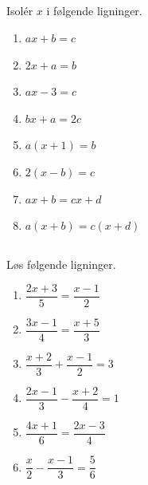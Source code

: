 \documentclass[10pt,a4paper,table]{article}
\begin{document}
\subsection{}
Isolér $x$ i følgende ligninger.
\begin{enumerate}[label=\arabic*)]
  \item $ax + b = c$
  \item $2x + a = b$
  \item $ax - 3 = c$
  \item $bx + a = 2c$
  \item $a(x + 1) = b$
  \item $2(x - b) = c$
  \item $ax + b = cx + d$
  \item $a(x + b) = c(x + d)$
\end{enumerate}

\subsection{}
Løs følgende ligninger.
\begin{enumerate}[label=\arabic*)]
  \item $\dfrac{2x+3}{5} = \dfrac{x-1}{2}$
  \item $\dfrac{3x-1}{4} = \dfrac{x+5}{3}$
  \item $\dfrac{x+2}{3} + \dfrac{x-1}{2} = 3$
  \item $\dfrac{2x-1}{3} - \dfrac{x+2}{4} = 1$
  \item $\dfrac{4x+1}{6} = \dfrac{2x-3}{4}$
  \item $\dfrac{x}{2} - \dfrac{x-1}{3} = \dfrac{5}{6}$
\end{enumerate}
\end{document}
